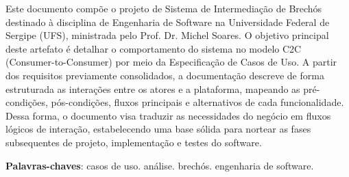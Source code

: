 \documentclass[
	article,			%
	11pt,				%
	oneside,			%
	a4paper,			%
	english,			%
	brazil,				%
	sumario=tradicional
	]{abntex2}
\begin{document}
\frenchspacing 

\newcommand{\inst}{UNIVERSIDADE FEDERAL DE SERGIPE (UFS)}
\newcommand{\centro}{CENTRO DE CIÊNCIAS EXATAS E TECNOLOGIA (CCET)}
\newcommand{\dept}{DEPARTAMENTO DE COMPUTAÇÃO (DCOMP)}
\newcommand{\disc}{ENGENHARIA DE SOFTWARE - COMP0503}

\makeatletter
\def\@maketitle{
\newpage
\null
\vskip 2em
\begin{center}
    \normalsize
    {\inst \par \centro \par \dept \par \disc \par}
    \vskip 3em
\let \footnote \thanks
{\normalsize \@title \par}
\vskip 3em
{\normalsize \flushright
    \lineskip .5em
    \begin{tabular}[t]{c}
    \@author
    \end{tabular}\par}
\vskip 1em
\end{center}%
\par
\vskip 1.5em}
\makeatother

\maketitle

\thispagestyle{empty}

\begin{resumoumacoluna}
Este documento compõe o projeto de Sistema de Intermediação de Brechós destinado à disciplina de Engenharia de Software na Universidade Federal de Sergipe (UFS), ministrada pelo Prof. Dr. Michel Soares. O objetivo principal deste artefato é detalhar o comportamento do sistema no modelo C2C (Consumer-to-Consumer) por meio da Especificação de Casos de Uso. A partir dos requisitos previamente consolidados, a documentação descreve de forma estruturada as interações entre os atores e a plataforma, mapeando as pré-condições, pós-condições, fluxos principais e alternativos de cada funcionalidade. Dessa forma, o documento visa traduzir as necessidades do negócio em fluxos lógicos de interação, estabelecendo uma base sólida para nortear as fases subsequentes de projeto, implementação e testes do software.
 
 \vspace{\onelineskip}
 
 \noindent
 \textbf{Palavras-chaves}: casos de uso. análise. brechós. engenharia de software.
\end{resumoumacoluna}
\end{document}
